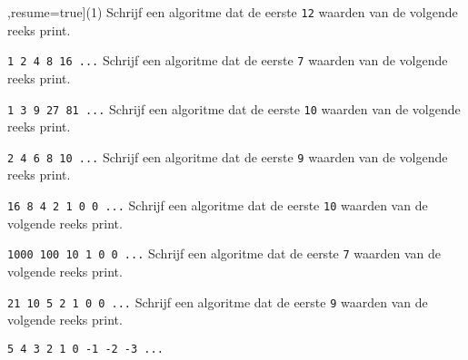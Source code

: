 \begin{exercise}
    \begin{longtasks}[counter-format=7.tsk[1],resume=true](1)
        \task
        Schrijf een algoritme dat de eerste \texttt{12} waarden van de volgende reeks print.

        \texttt{1 2 4 8 16 ...}
        \task
        Schrijf een algoritme dat de eerste \texttt{7} waarden van de volgende reeks print.

        \texttt{1 3 9 27 81 ...}
        \task
        Schrijf een algoritme dat de eerste \texttt{10} waarden van de volgende reeks print.

        \texttt{2 4 6 8 10 ...}
        \task
        Schrijf een algoritme dat de eerste \texttt{9} waarden van de volgende reeks print.

        \texttt{16 8 4 2 1 0 0 ...}
        \task
        Schrijf een algoritme dat de eerste \texttt{10} waarden van de volgende reeks print.

        \texttt{1000 100 10 1 0 0 ...}
        \task
        Schrijf een algoritme dat de eerste \texttt{7} waarden van de volgende reeks print.

        \texttt{21 10 5 2 1 0 0 ...}
        \task
        Schrijf een algoritme dat de eerste \texttt{9} waarden van de volgende reeks print.

        \texttt{5 4 3 2 1 0 -1 -2 -3 ...}
    \end{longtasks}
\end{exercise}
